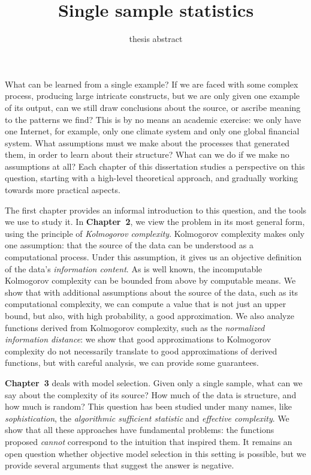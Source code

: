 \documentclass{scrartcl}
\title{Single sample statistics}
\subtitle{thesis abstract}
\date{}
\begin{document}
 

\maketitle

\noindent What can be learned from a single example? If we are faced with some complex process, producing large intricate constructs, but we are only given one example of its output, can we still draw conclusions about the source, or ascribe meaning to the patterns we find? This is by no means an academic exercise: we only have one Internet, for example, only one climate system and only one global financial system. What assumptions must we make about the processes that generated them, in order to learn about their structure? What can we do if we make no assumptions at all? Each chapter of this dissertation studies a perspective on this question, starting with a high-level theoretical approach, and gradually working towards more practical aspects. 

The first chapter provides an informal introduction to this question, and the tools we use to study it. In \textbf{Chapter~2}, we view the problem in its most general form, using the principle of \emph{Kolmogorov complexity}. Kolmogorov complexity makes only one assumption: that the source of the data can be understood as a computational process. Under this assumption, it gives us an objective definition of the data's \emph{information content}. As is well known, the incomputable Kolmogorov complexity can be bounded from above by computable means. We show that with additional assumptions about the source of the data, such as its computational complexity, we can compute a value that is not just an upper bound, but also, with high probability, a good approximation. We also analyze functions derived from Kolmogorov complexity, such as the \emph{normalized information distance}: we show that good approximations to Kolmogorov complexity do not necessarily translate to good approximations of derived functions, but with careful analysis, we can provide some guarantees.

\textbf{Chapter~3} deals with model selection. Given only a single  sample, what can we say about the complexity of its source? How much of the data is structure, and how much is random? This question has been studied under many names, like \emph{sophistication}, the \emph{algorithmic sufficient statistic} and  \emph{effective complexity}. We show that all these approaches have fundamental problems: the functions proposed \emph{cannot} correspond to the intuition that inspired them. It remains an open question whether objective model selection in this setting is possible, but we provide several arguments that suggest the answer is negative.
\end{document}
